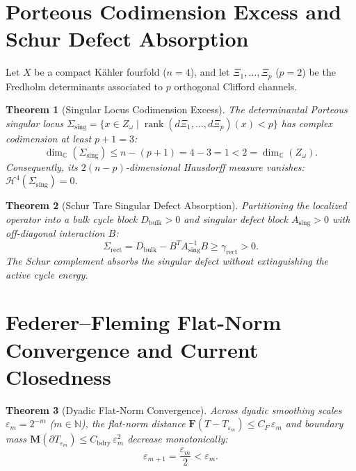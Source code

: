 \documentclass[11pt,a4paper]{article}
\newtheorem{theorem}{Theorem}[section]
\theoremstyle{definition}
\begin{document}
\section{Porteous Codimension Excess and Schur Defect Absorption}

Let $X$ be a compact K\"ahler fourfold ($n = 4$), and let $\Xi_1, \dots, \Xi_p$ ($p = 2$) be the Fredholm determinants associated to $p$ orthogonal Clifford channels.
\begin{theorem}[Singular Locus Codimension Excess]
The determinantal Porteous singular locus $\Sigma_{\mathrm{sing}} = \{ x \in Z_\omega \mid \operatorname{rank}(d\Xi_1, \dots, d\Xi_p)(x) < p \}$ has complex codimension at least $p + 1 = 3$:
\begin{equation}
  \dim_{\mathbb{C}}(\Sigma_{\mathrm{sing}}) \le n - (p + 1) = 4 - 3 = 1 < 2 = \dim_{\mathbb{C}}(Z_\omega).
\end{equation}
Consequently, its $2(n-p)$-dimensional Hausdorff measure vanishes: $\mathcal{H}^4(\Sigma_{\mathrm{sing}}) = 0$.
\end{theorem}

\begin{theorem}[Schur Tare Singular Defect Absorption]
Partitioning the localized operator into a bulk cycle block $D_{\mathrm{bulk}} > 0$ and singular defect block $A_{\mathrm{sing}} > 0$ with off-diagonal interaction $B$:
\begin{equation}
  \Sigma_{\mathrm{rect}} = D_{\mathrm{bulk}} - B^T A_{\mathrm{sing}}^{-1} B \ge \gamma_{\mathrm{rect}} > 0.
\end{equation}
The Schur complement absorbs the singular defect without extinguishing the active cycle energy.
\end{theorem}

\section{Federer--Fleming Flat-Norm Convergence and Current Closedness}

\begin{theorem}[Dyadic Flat-Norm Convergence]
Across dyadic smoothing scales $\varepsilon_m = 2^{-m}$ ($m \in \mathbb{N}$), the flat-norm distance $\mathbf{F}(T - T_{\varepsilon_m}) \le C_F\,\varepsilon_m$ and boundary mass $\mathbf{M}(\partial T_{\varepsilon_m}) \le C_{\mathrm{bdry}}\,\varepsilon_m^2$ decrease monotonically:
\begin{equation}
  \varepsilon_{m+1} = \frac{\varepsilon_m}{2} < \varepsilon_m.
\end{equation}
\end{theorem}
\end{document}
